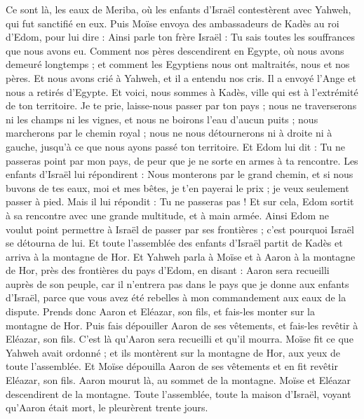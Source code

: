 \begin{multicols}{2}
Ce sont là, les eaux de Meriba, où les enfants d'Israël contestèrent avec Yahweh, qui fut sanctifié en eux.
Puis Moïse envoya des ambassadeurs de Kadès au roi d'Edom, pour lui dire : Ainsi parle ton frère Israël : Tu sais toutes les souffrances que nous avons eu.
Comment nos pères descendirent en Egypte, où nous avons demeuré longtemps ; et comment les Egyptiens nous ont maltraités, nous et nos pères.
Et nous avons crié à Yahweh, et il a entendu nos cris. Il a envoyé l'Ange et nous a retirés d'Egypte. Et voici, nous sommes à Kadès, ville qui est à l'extrémité de ton territoire.
Je te prie, laisse-nous passer par ton pays ; nous ne traverserons ni les champs ni les vignes, et nous ne boirons l'eau d'aucun puits ; nous marcherons par le chemin royal ; nous ne nous détournerons ni à droite ni à gauche, jusqu'à ce que nous ayons passé ton territoire.
Et Edom lui dit : Tu ne passeras point par mon pays, de peur que je ne sorte en armes à ta rencontre.
Les enfants d'Israël lui répondirent : Nous monterons par le grand chemin, et si nous buvons de tes eaux, moi et mes bêtes, je t'en payerai le prix ; je veux seulement passer à pied.
Mais il lui répondit : Tu ne passeras pas ! Et sur cela, Edom sortit à sa rencontre avec une grande multitude, et à main armée.
Ainsi Edom ne voulut point permettre à Israël de passer par ses frontières ; c'est pourquoi Israël se détourna de lui.
Et toute l'assemblée des enfants d'Israël partit de Kadès et arriva à la montagne de Hor.
Et Yahweh parla à Moïse et à Aaron à la montagne de Hor, près des frontières du pays d'Edom, en disant :
Aaron sera recueilli auprès de son peuple, car il n'entrera pas dans le pays que je donne aux enfants d'Israël, parce que vous avez été rebelles à mon commandement aux eaux de la dispute.
Prends donc Aaron et Eléazar, son fils, et fais-les monter sur la montagne de Hor.
Puis fais dépouiller Aaron de ses vêtements, et fais-les revêtir à Eléazar, son fils. C'est là qu'Aaron sera recueilli et qu'il mourra.
Moïse fit ce que Yahweh avait ordonné ; et ils montèrent sur la montagne de Hor, aux yeux de toute l'assemblée.
Et Moïse dépouilla Aaron de ses vêtements et en fit revêtir Eléazar, son fils. Aaron mourut là, au sommet de la montagne. Moïse et Eléazar descendirent de la montagne.
Toute l'assemblée, toute la maison d'Israël, voyant qu'Aaron était mort, le pleurèrent trente jours.

\end{multicols}
